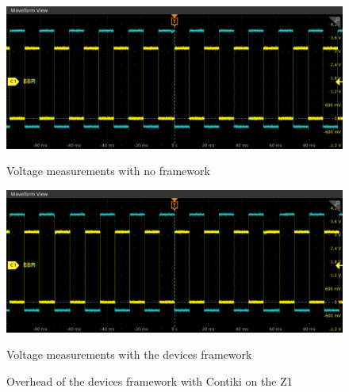 
\begin{figure}[!ht]
  \begin{minipage}{.45\textwidth}
      \centering
      \includegraphics[scale=.25]{assets/reference-value-overhead-contiki-z1.png}
      \caption*{Voltage measurements with no framework}
  \end{minipage}\hfill
  \begin{minipage}{.45\textwidth}        
      \centering
      \includegraphics[scale=.25]{assets/devices-framework-overhead-contiki-z1.png}
      \caption*{Voltage measurements with the devices framework}
  \end{minipage}
  \caption{Overhead of the devices framework with Contiki on the Z1 \label{fig:overhead-devices-contiki-z1}}
\end{figure}
